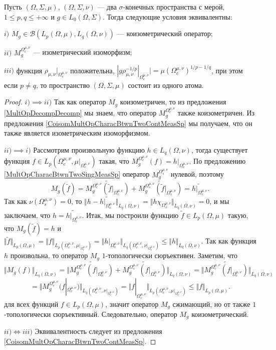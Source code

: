 \begin{proposition}\label{CoisomMultOpCharacBtwnTwoMeasSp} Пусть $(\Omega,\Sigma,\mu)$, $(\Omega,\Sigma,\nu)$ --- два $\sigma$-конечных пространства с мерой, $1\leq p,q\leq +\infty$ и $g\in L_0(\Omega,\Sigma)$. Тогда следующие условия эквивалентны: 

$i)$ $M_g\in\mathcal{B}(L_p(\Omega,\mu), L_q(\Omega,\nu))$ --- коизометрический оператор;

$ii)$ $M_g^{\Omega_c^{\mu,\nu}}$ --- изометрический изоморфизм;

$iii)$ функция $\rho_{\mu,\nu}|_{\Omega_c^{\mu,\nu}}$ положительна, $|g \rho_{\mu,\nu}^{-1/p}|_{\Omega_c^{\mu,\nu}}|=\mu(\Omega_c^{\mu,\nu})^{1/p-1/q}$, при этом если $p\neq q$, то пространство $(\Omega,\Sigma,\mu)$ состоит из одного атома.
\end{proposition}
\begin{proof} $i)$$\implies$$ ii)$ Так как оператор $M_g$ коизометричен, то из предложения \ref{MultOpDecompDecomp} мы знаем, что оператор $M_g^{\Omega_c^{\mu,\nu}}$ также коизометричен. Из предложения \ref{CoisomMultOpCharacBtwnTwoContMeasSp} мы получаем, что он также является изометрическим изоморфизмом. 

$ii)$$\implies$$ i)$ Рассмотрим произвольную функцию $h\in L_q(\Omega,\nu)$, тогда существует функция $f\in L_p(\Omega_c^{\mu,\nu},\mu|_{\Omega_c^{\mu,\nu}})$ такая, что $M_g^{\Omega_c^{\mu,\nu}}(f)=h|_{\Omega_c^{\mu,\nu}}$. По предложению \ref{MultOpCharacBtwnTwoSingMeasSp} оператор $M_g^{\Omega_s^{\mu,\nu}}$ нулевой, поэтому
$$
M_g(\widetilde{f})
=\widetilde{M_g^{\Omega_c^{\mu,\nu}}(\widetilde{f}|_{\Omega_c^{\mu,\nu}})}+\widetilde{M_g^{\Omega_s^{\mu,\nu}}(\widetilde{f}|_{\Omega_s^{\mu,\nu}})}
=\widetilde{h|_{\Omega_c^{\mu,\nu}}}.
$$
Так как $\nu(\Omega_s^{\mu,\nu})=0$, то $\Vert h-\widetilde{h|_{\Omega_c^{\mu,\nu}}}\Vert_{L_q(\Omega,\nu)}=\Vert h\chi_{\Omega_s^{\mu,\nu}}\Vert_{L_q(\Omega,\nu)}=0$, и мы заключаем, что $h=\widetilde{h|_{\Omega_c^{\mu,\nu}}}$. Итак, мы построили функцию $\widetilde{f}\in L_p(\Omega,\mu)$ такую, что $M_g(\widetilde{f})=h$ и $\Vert \widetilde{f}\Vert_{L_p(\Omega,\mu)}=\Vert f\Vert_{L_p(\Omega_c^{\mu,\nu},\mu|_{\Omega_c^{\mu,\nu}})}=\Vert h|_{\Omega_c^{\mu,\nu}}\Vert_{L_q(\Omega_c^{\mu,\nu},\nu|_{\Omega_c^{\mu,\nu}})}\leq\Vert h\Vert_{L_q(\Omega,\nu)}$. Так как функция $h$ произвольна, то оператор $M_g$ $1$-топологически сюръективен. Заметим, что
$$
\Vert M_g(f)\Vert_{L_q(\Omega,\nu)}
=\Vert\widetilde{M_g^{\Omega_c^{\mu,\nu}}(f|_{\Omega_c^{\mu,\nu}})}+\widetilde{M_g^{\Omega_s^{\mu,\nu}}(f|_{\Omega_s^{\mu,\nu}})}\Vert_{L_q(\Omega,\nu)}
=\Vert\widetilde{M_g^{\Omega_c^{\mu,\nu}}(f|_{\Omega_c^{\mu,\nu}})}\Vert_{L_q(\Omega,\nu)}
$$
$$
=\Vert M_g^{\Omega_c^{\mu,\nu}}(f|_{\Omega_c^{\mu,\nu}})\Vert_{L_q(\Omega_c^{\mu,\nu},\nu|_{\Omega_c^{\mu,\nu}})}
=\Vert f|_{\Omega_c^{\mu,\nu}}\Vert_{L_p(\Omega_c^{\mu,\nu},\mu|_{\Omega_c^{\mu,\nu}})}
\leq\Vert f \Vert_{L_p(\Omega,\mu)}.
$$
для всех функций $f\in L_p(\Omega,\mu)$, значит оператор $M_g$ сжимающий, но от также $1$-топологически сюръективный. Следовательно, оператор $M_g$ коизометрический.

$ii)\Longleftrightarrow iii)$ Эквивалентность следует из предложения \ref{CoisomMultOpCharacBtwnTwoContMeasSp}.
\end{proof}

